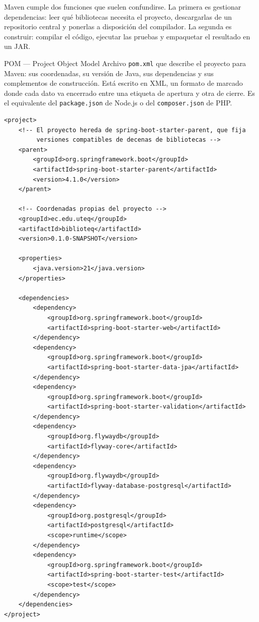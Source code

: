 \documentclass[11pt,a4paper,openany]{book}
\begin{document}
Maven cumple dos funciones que suelen confundirse. La primera es gestionar dependencias: leer qué bibliotecas necesita el proyecto, descargarlas de un repositorio central y ponerlas a disposición del compilador. La segunda es construir: compilar el código, ejecutar las pruebas y empaquetar el resultado en un JAR.

\begin{cajadefinicion}{POM --- Project Object Model}
	Archivo \texttt{pom.xml} que describe el proyecto para Maven: sus coordenadas, su versión de Java, sus dependencias y sus complementos de construcción. Está escrito en XML, un formato de marcado donde cada dato va encerrado entre una etiqueta de apertura y otra de cierre. Es el equivalente del \texttt{package.json} de Node.js o del \texttt{composer.json} de PHP.
\end{cajadefinicion}

\begin{lstlisting}[style=xml,caption={Fragmento esencial del archivo pom.xml generado.},label={lst:pom}]
<project>
	<!-- El proyecto hereda de spring-boot-starter-parent, que fija
	     versiones compatibles de decenas de bibliotecas -->
	<parent>
		<groupId>org.springframework.boot</groupId>
		<artifactId>spring-boot-starter-parent</artifactId>
		<version>4.1.0</version>
	</parent>

	<!-- Coordenadas propias del proyecto -->
	<groupId>ec.edu.uteq</groupId>
	<artifactId>biblioteq</artifactId>
	<version>0.1.0-SNAPSHOT</version>

	<properties>
		<java.version>21</java.version>
	</properties>

	<dependencies>
		<dependency>
			<groupId>org.springframework.boot</groupId>
			<artifactId>spring-boot-starter-web</artifactId>
		</dependency>
		<dependency>
			<groupId>org.springframework.boot</groupId>
			<artifactId>spring-boot-starter-data-jpa</artifactId>
		</dependency>
		<dependency>
			<groupId>org.springframework.boot</groupId>
			<artifactId>spring-boot-starter-validation</artifactId>
		</dependency>
		<dependency>
			<groupId>org.flywaydb</groupId>
			<artifactId>flyway-core</artifactId>
		</dependency>
		<dependency>
			<groupId>org.flywaydb</groupId>
			<artifactId>flyway-database-postgresql</artifactId>
		</dependency>
		<dependency>
			<groupId>org.postgresql</groupId>
			<artifactId>postgresql</artifactId>
			<scope>runtime</scope>
		</dependency>
		<dependency>
			<groupId>org.springframework.boot</groupId>
			<artifactId>spring-boot-starter-test</artifactId>
			<scope>test</scope>
		</dependency>
	</dependencies>
</project>
\end{lstlisting}
\end{document}
